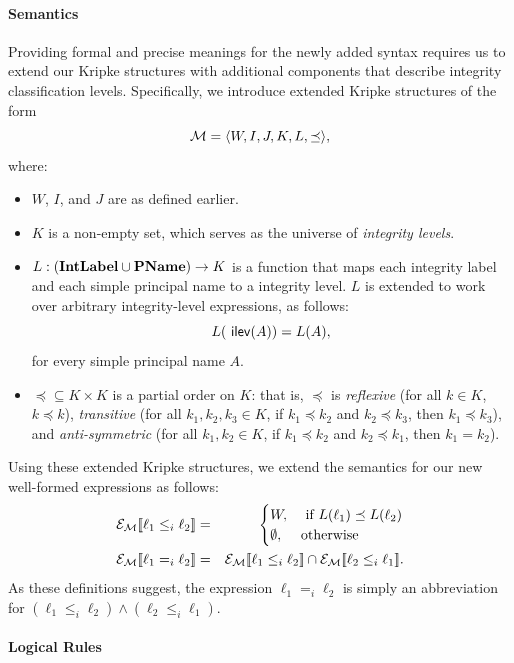 \paragraph*{Semantics}

Providing formal and precise meanings for the newly added syntax
requires us to extend our Kripke structures with additional components
that describe integrity classification levels.  Specifically, we
introduce extended Kripke structures of the form
\[ \mathcal{M} = \langle {W,I,J,K,L,\preceq} \rangle, \]
where:
\begin{itemize}
\item $W$, $I$, and $J$ are as defined earlier.
\item $K$ is a non-empty set, which serves as the universe of 
  \emph{integrity levels}.
\item $L: (\textbf{IntLabel} \cup \textbf{PName}) \rightarrow K$ is a function that maps
  each integrity label and each simple principal name to a integrity
  level. $L$ is extended to work over arbitrary integrity-level
  expressions, as follows:
  \[ L(\text{\textsf{ ilev}}(A)) = L(A), \]
  for every simple principal name $A$.
\item $\preceq \subseteq K\times K$ is a partial order on $K$: that is,
  $\preceq$ is \emph{reflexive} (for all $k\in K$, $k \preceq k$),
  \emph{transitive} (for all $k_1,k_2,k_3\in K$, if $k_1 \preceq k_2$
  and $k_2 \preceq k_3$, then $k_1 \preceq k_3$), and
  \emph{anti-symmetric} (for all $k_1,k_2\in K$, if $k_1 \preceq
  k_2$ and $k_2\preceq k_1$, then $k_1 = k_2$).
\end{itemize}

Using these extended Kripke structures, we extend the semantics for
our new well-formed expressions as follows:
\begin{eqnarray*}
   \E{\ell_1 \leq_i \ell_2} &=&
   \begin{cases}
     W, & \text{ if } L(\ell_1) \preceq L(\ell_2) \\
     \emptyset, & \text{otherwise} 
   \end{cases} \\
   \E{\ell_1 =_i \ell_2} &=& \E{\ell_1 \leq_i \ell_2} \cap \E{\ell_2
     \leq_i \ell_1}.
\end{eqnarray*}
As these definitions suggest, the expression $\ell_1 =_i \ell_2$ is
simply an abbreviation for $(\ell_1 \leq_i \ell_2) \wedge (\ell_2
\leq_i \ell_1)$.

\paragraph*{Logical Rules}

